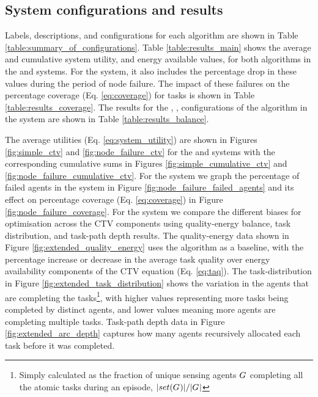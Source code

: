 \subsection{System configurations and results}
Labels, descriptions, and configurations for each algorithm are shown in Table \ref{table:summary_of_configurations}. Table \ref{table:results_main} shows the average and cumulative system utility, and energy available values, for both algorithms in the \simulationSimple{}{} and  \simulationNodeFailure{}{} systems. For the \simulationNodeFailure{}{} system, it also includes the percentage drop in these values during the period of node failure. The impact of these failures on the percentage coverage (Eq. \ref{eq:coverage}) for tasks is shown in Table \ref{table:results_coverage}. The results for the \algorithmEnergy{}{}, \algorithmQuality{}{}, \algorithmDistribution{}{} configurations of the \acronymWSNOptimisation{}{} algorithm in the \simulationExtended{}{} system are shown in Table \ref{table:results_balance}. 

The average utilities  (Eq. \ref{eq:system_utility}) are shown in Figures \ref{fig:simple_ctv} and \ref{fig:node_failure_ctv} for the \simulationSimple{}{} and \simulationNodeFailure{}{} systems with the corresponding cumulative sums in Figures \ref{fig:simple_cumulative_ctv} and \ref{fig:node_failure_cumulative_ctv}. For the \simulationNodeFailure{}{} system we graph the percentage of failed agents in the system in Figure \ref{fig:node_failure_failed_agents} and its effect on percentage coverage (Eq. \ref{eq:coverage}) in Figure \ref{fig:node_failure_coverage}.  For the \simulationExtended{}{} system we compare the different biases for optimisation across the CTV components using quality-energy balance, task distribution, and task-path depth results. The quality-energy data shown in Figure \ref{fig:extended_quality_energy} uses the \algorithmEnergy{}{} algorithm as a baseline, with the percentage increase or decrease in the average task quality over energy availability components of the CTV equation (Eq. \ref{eq:taq}). The task-distribution in Figure \ref{fig:extended_task_distribution} shows the variation in the agents that are completing the tasks\footnote{ Simply calculated as the fraction of unique sensing agents $G_{}^{}$ completing all the atomic tasks during an episode, $\lvert set(G_{}^{}) \rvert{}/\lvert G_{}^{} \rvert{}$}, with higher values representing more tasks being completed by distinct agents, and lower values meaning more agents are completing multiple tasks. Task-path depth data in Figure \ref{fig:extended_arc_depth} captures how many agents recursively allocated each task before it was completed.